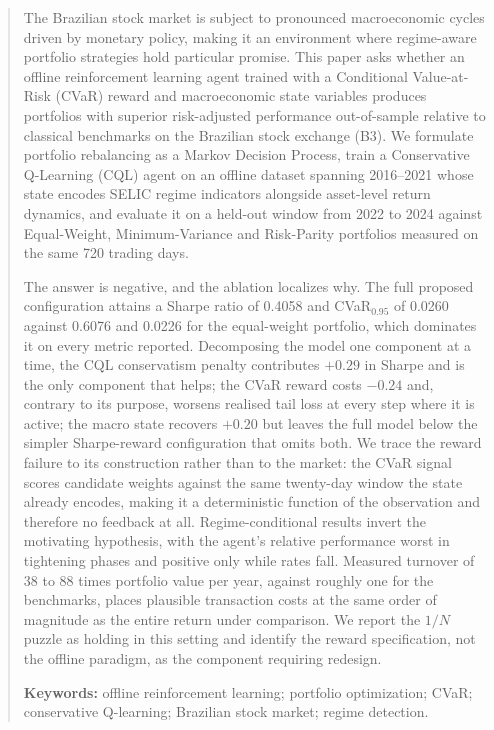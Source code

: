 \begin{abstract}
The Brazilian stock market is subject to pronounced macroeconomic cycles driven by
monetary policy, making it an environment where regime-aware portfolio strategies hold
particular promise.
This paper asks whether an offline reinforcement learning agent trained with a
Conditional Value-at-Risk (CVaR) reward and macroeconomic state variables produces
portfolios with superior risk-adjusted performance out-of-sample relative to classical
benchmarks on the Brazilian stock exchange (B3).
We formulate portfolio rebalancing as a Markov Decision Process, train a
Conservative Q-Learning (CQL) agent on an offline dataset spanning 2016--2021 whose
state encodes SELIC regime indicators alongside asset-level return dynamics, and
evaluate it on a held-out window from 2022 to 2024 against Equal-Weight,
Minimum-Variance and Risk-Parity portfolios measured on the same 720 trading days.

The answer is negative, and the ablation localizes why.
The full proposed configuration attains a Sharpe ratio of 0.4058 and
CVaR$_{0.95}$ of 0.0260 against 0.6076 and 0.0226 for the equal-weight portfolio,
which dominates it on every metric reported.
Decomposing the model one component at a time, the CQL conservatism penalty
contributes $+0.29$ in Sharpe and is the only component that helps; the CVaR reward
costs $-0.24$ and, contrary to its purpose, worsens realised tail loss at every step
where it is active; the macro state recovers $+0.20$ but leaves the full model below
the simpler Sharpe-reward configuration that omits both.
We trace the reward failure to its construction rather than to the market: the CVaR
signal scores candidate weights against the same twenty-day window the state already
encodes, making it a deterministic function of the observation and therefore no
feedback at all.
Regime-conditional results invert the motivating hypothesis, with the agent's relative
performance worst in tightening phases and positive only while rates fall.
Measured turnover of 38 to 88 times portfolio value per year, against roughly one for
the benchmarks, places plausible transaction costs at the same order of magnitude as
the entire return under comparison.
We report the $1/N$ puzzle as holding in this setting and identify the reward
specification, not the offline paradigm, as the component requiring redesign.

\textbf{Keywords:} offline reinforcement learning; portfolio optimization;
CVaR; conservative Q-learning; Brazilian stock market; regime detection.
\end{abstract}
